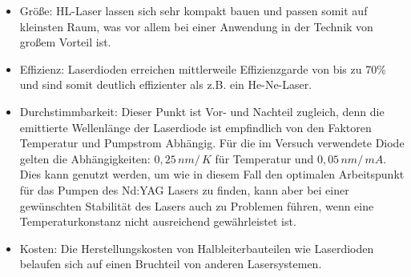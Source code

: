 \documentclass[twoside,colorback,accentcolor=tud4c,11pt]{tudreport}
\begin{document}
\begin{itemize}
\item Größe: HL-Laser lassen sich sehr kompakt bauen und passen somit auf kleinsten Raum, was vor allem bei einer Anwendung in der Technik von großem Vorteil ist.
\item Effizienz: Laserdioden erreichen mittlerweile Effizienzgarde von bis zu 70\% und sind somit deutlich effizienter als z.B. ein He-Ne-Laser.
\item Durchstimmbarkeit: Dieser Punkt ist Vor- und Nachteil zugleich, denn die emittierte Wellenlänge der Laserdiode ist empfindlich von den Faktoren Temperatur und Pumpstrom Abhängig. Für die im Versuch verwendete Diode gelten die Abhängigkeiten: $0,25\,\si{nm}/\,\si{K}$ für Temperatur und $0,05\,\si{nm}/\,\si{mA}$. Dies kann genutzt werden, um wie in diesem Fall den optimalen Arbeitspunkt für das Pumpen des Nd:YAG Lasers zu finden, kann aber bei einer gewünschten Stabilität des Lasers auch zu Problemen führen, wenn eine Temperaturkonstanz nicht ausreichend gewährleistet ist.
\item Kosten: Die Herstellungskosten von Halbleiterbauteilen wie Laserdioden belaufen sich auf einen Bruchteil von anderen Lasersystemen.
\end{itemize}\cite{1,3}
\end{document}
